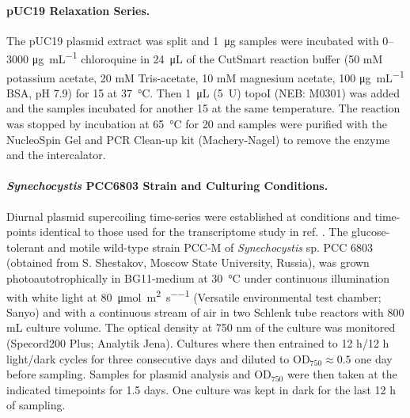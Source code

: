 \documentclass[10pt,a4]{article}
\newcommand{\photons}{\micro\mol\per\square\meter\per\second}
\newcommand{\ugml}{\micro\gram\per\milli\liter}
\newcommand{\scyst}{\textit{Synechocystis} PCC6803}
\newcommand{\OD}{\ensuremath{\text{OD}_{750}}}
\begin{document}
\paragraph{pUC19 Relaxation Series.}
The pUC19 plasmid extract was split and \SI{1}{\ug} samples were
incubated with 0--3000 \si{\ugml} chloroquine in \SI{24}{\uL} of the
CutSmart reaction buffer (50 mM potassium acetate, 20 mM Tris-acetate,
10 mM magnesium acetate, 100 \si{\ugml} BSA, pH 7.9) for \SI{15}{\min}
at \SI{37}{\celsius}. Then \SI{1}{\uL} (\SI{5}{U}) topoI (NEB: M0301)
was added and the samples incubated for another \SI{15}{\min} at the
same temperature. The reaction was stopped by incubation at
\SI{65}{\celsius} for \SI{20}{\min} and samples were purified with the
NucleoSpin Gel and PCR Clean-up kit (Machery-Nagel) to remove the
enzyme and the intercalator.

\paragraph{\scyst{} Strain and Culturing Conditions.}
Diurnal plasmid supercoiling time-series were established at
conditions and time-points identical to those used for the
transcriptome study in ref. \cite{Lehmann2013, Beck2014}.  The
glucose-tolerant and motile wild-type strain PCC-M of
\textit{Synechocystis} sp. PCC 6803 (obtained from S.  Shestakov,
Moscow State University, Russia), was grown photoautotrophically in
BG11-medium at \SI{30}{\celsius} under continuous illumination with
white light at \SI{80}{\photons} (Versatile environmental test
chamber; Sanyo) and with a continuous stream of air in two 
Schlenk tube reactors with 800 mL culture volume.  The optical
density at 750 nm of the culture was monitored (Specord200 Plus;
Analytik Jena). Cultures where then entrained to 12 h/12 h light/dark
cycles for three consecutive days and diluted to $\OD{}\approx 0.5$
one day before sampling. Samples for plasmid analysis and \OD{} were
then taken at the indicated timepoints for 1.5 days. One culture was
kept in dark for the last 12 h of sampling.
\end{document}
